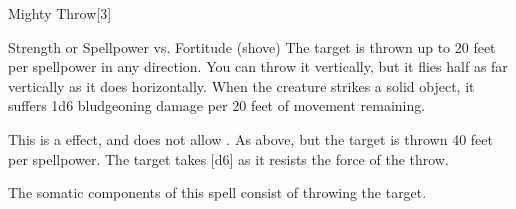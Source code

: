 \begin{spellsection}{Mighty Throw}[3]
    \begin{spellheader}
    \end{spellheader}
    \begin{spellcontent}
        \begin{spelltargetinginfo}
        \end{spelltargetinginfo}
        \begin{spelleffects}
            \begin{spellattack}{Strength or Spellpower vs. Fortitude (shove)}
                \spellsuccess The target is thrown up to 20 feet per spellpower in any direction. You can throw it vertically, but it flies half as far vertically as it does horizontally. When the creature strikes a solid object, it suffers 1d6 bludgeoning damage per 20 feet of movement remaining.
                \par This is a  effect, and does not allow .
                \spellcritical As above, but the target is thrown 40 feet per spellpower.
                \spellfailure The target takes [d6] as it resists the force of the throw.
            \end{spellattack}
        \end{spelleffects}
    \end{spellcontent}
    \begin{spellfooter}
        \spellnotes The somatic components of this spell consist of throwing the target.
        \miscastexplode
    \end{spellfooter}
    \begin{spellaugments}
    \end{spellaugments}
\end{spellsection}

